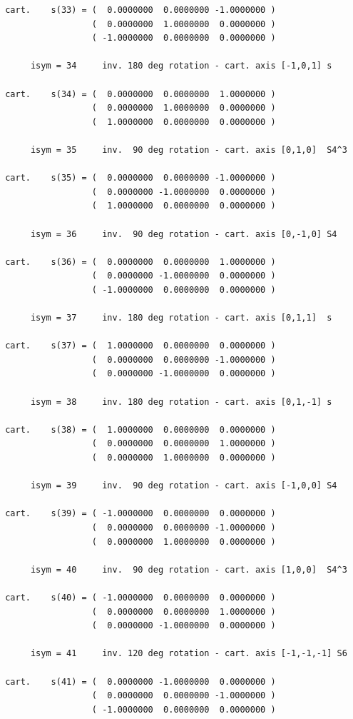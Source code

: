 \documentclass[12pt,a4paper]{article}
\begin{document}
\begin{verbatim}
 cart.    s(33) = (  0.0000000  0.0000000 -1.0000000 )
                  (  0.0000000  1.0000000  0.0000000 )
                  ( -1.0000000  0.0000000  0.0000000 )

      isym = 34     inv. 180 deg rotation - cart. axis [-1,0,1] s

 cart.    s(34) = (  0.0000000  0.0000000  1.0000000 )
                  (  0.0000000  1.0000000  0.0000000 )
                  (  1.0000000  0.0000000  0.0000000 )

      isym = 35     inv.  90 deg rotation - cart. axis [0,1,0]  S4^3

 cart.    s(35) = (  0.0000000  0.0000000 -1.0000000 )
                  (  0.0000000 -1.0000000  0.0000000 )
                  (  1.0000000  0.0000000  0.0000000 )

      isym = 36     inv.  90 deg rotation - cart. axis [0,-1,0] S4

 cart.    s(36) = (  0.0000000  0.0000000  1.0000000 )
                  (  0.0000000 -1.0000000  0.0000000 )
                  ( -1.0000000  0.0000000  0.0000000 )

      isym = 37     inv. 180 deg rotation - cart. axis [0,1,1]  s

 cart.    s(37) = (  1.0000000  0.0000000  0.0000000 )
                  (  0.0000000  0.0000000 -1.0000000 )
                  (  0.0000000 -1.0000000  0.0000000 )

      isym = 38     inv. 180 deg rotation - cart. axis [0,1,-1] s

 cart.    s(38) = (  1.0000000  0.0000000  0.0000000 )
                  (  0.0000000  0.0000000  1.0000000 )
                  (  0.0000000  1.0000000  0.0000000 )

      isym = 39     inv.  90 deg rotation - cart. axis [-1,0,0] S4

 cart.    s(39) = ( -1.0000000  0.0000000  0.0000000 )
                  (  0.0000000  0.0000000 -1.0000000 )
                  (  0.0000000  1.0000000  0.0000000 )

      isym = 40     inv.  90 deg rotation - cart. axis [1,0,0]  S4^3

 cart.    s(40) = ( -1.0000000  0.0000000  0.0000000 )
                  (  0.0000000  0.0000000  1.0000000 )
                  (  0.0000000 -1.0000000  0.0000000 )

      isym = 41     inv. 120 deg rotation - cart. axis [-1,-1,-1] S6

 cart.    s(41) = (  0.0000000 -1.0000000  0.0000000 )
                  (  0.0000000  0.0000000 -1.0000000 )
                  ( -1.0000000  0.0000000  0.0000000 )


\end{verbatim}
\end{document}
